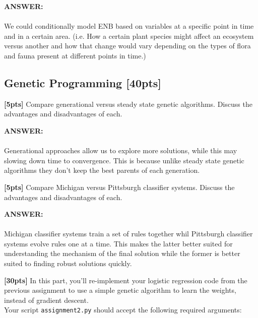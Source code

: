 \documentclass[paper=a4, fontsize=11pt]{scrartcl} %
\numberwithin{figure}{section} %
\numberwithin{table}{section} %
\begin{document}
\begin{addmargin}[2em]{2em}
  \textbf{ANSWER:} \\\\
  We could conditionally model ENB based on variables at a specific point in time and in a certain area. (i.e. How a certain plant species might affect an ecosystem versus another and how that change would vary depending on the types of flora and fauna present at different points in time.)
\end{addmargin}


\subsection{Genetic Programming \textbf{[40pts]}}

\textbf{[5pts]} Compare generational versus steady state genetic algorithms. Discuss the advantages and disadvantages of each. \\
\begin{addmargin}[2em]{2em}
  \textbf{ANSWER:}\\\\
  Generational approaches allow us to explore more solutions, while this may slowing down time to convergence. This is because unlike steady state genetic algorithms they don't keep the best parents of each generation.
  \\
\end{addmargin}

\textbf{[5pts]} Compare Michigan versus Pittsburgh classifier systems. Discuss the advantages and disadvantages of each. \\

\begin{addmargin}[2em]{2em}
  \textbf{ANSWER:}\\\\
  Michigan classifier systems train a set of rules together whil Pittsburgh classifier systems evolve rules one at a time. This makes the latter better suited for understanding the mechanism of the final solution while the former is better suited to finding robust solutions quickly.
  \\
\end{addmargin}

\textbf{[30pts]} In this part, you'll re-implement your logistic regression code from the previous assignment to use a simple genetic algorithm to learn the weights, instead of gradient descent. \\

Your script \texttt{assignment2.py} should accept the following required arguments:
\end{document}

